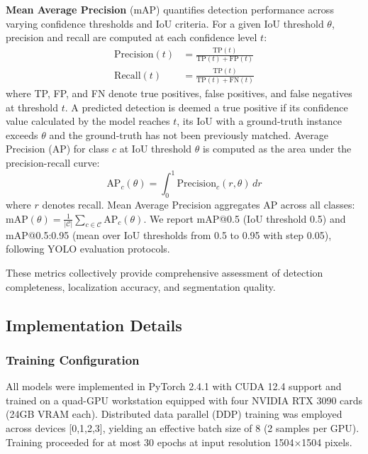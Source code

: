 \documentclass[journal,twoside,web]{ieeecolor}
\begin{document}
\textbf{Mean Average Precision} (mAP) quantifies detection performance across varying confidence thresholds and IoU criteria. For a given IoU threshold $\theta$, precision and recall are computed at each confidence level $t$:
\begin{equation}
\begin{aligned}
\text{Precision}(t) &= \frac{\text{TP}(t)}{\text{TP}(t) + \text{FP}(t)} \\
\text{Recall}(t) &= \frac{\text{TP}(t)}{\text{TP}(t) + \text{FN}(t)}
\end{aligned}
\end{equation}
where TP, FP, and FN denote true positives, false positives, and false negatives at threshold $t$. A predicted detection is deemed a true positive if its confidence value calculated by the model reaches $t$, its IoU with a ground-truth instance exceeds $\theta$ and the ground-truth has not been previously matched. Average Precision (AP) for class $c$ at IoU threshold $\theta$ is computed as the area under the precision-recall curve:
\begin{equation}
\text{AP}_c(\theta) = \int_{0}^{1} \text{Precision}_c(r, \theta) \, dr
\end{equation}
where $r$ denotes recall. Mean Average Precision aggregates AP across all classes: $\text{mAP}(\theta) = \frac{1}{|\mathcal{C}|} \sum_{c \in \mathcal{C}} \text{AP}_c(\theta)$. We report mAP@0.5 (IoU threshold 0.5) and mAP@0.5:0.95 (mean over IoU thresholds from 0.5 to 0.95 with step 0.05), following YOLO evaluation protocols.

These metrics collectively provide comprehensive assessment of detection completeness, localization accuracy, and segmentation quality.

\subsection{Implementation Details}

\subsubsection{Training Configuration} All models were implemented in PyTorch 2.4.1 with CUDA 12.4 support and trained on a quad-GPU workstation equipped with four NVIDIA RTX 3090 cards (24GB VRAM each). Distributed data parallel (DDP) training was employed across devices [0,1,2,3], yielding an effective batch size of 8 (2 samples per GPU). Training proceeded for at most 30 epochs at input resolution 1504$\times$1504 pixels.
\end{document}
